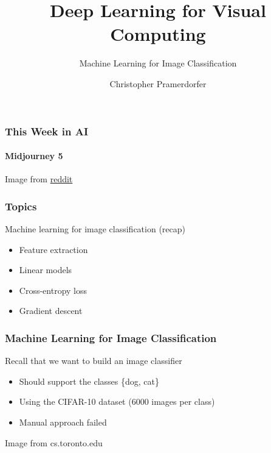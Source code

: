 \documentclass[xetex,professionalfont]{beamer}
\title{Deep Learning for Visual Computing}
\subtitle{Machine Learning for Image Classification}
\author{Christopher Pramerdorfer}
\institute{Computer Vision Lab, TU Wien}
\begin{document}
\begin{frame}
\maketitle
\end{frame}


\begin{frame}
\frametitle{This Week in AI}
\framesubtitle{Midjourney 5}

\begin{center}
  {\centering Image from \href{https://www.reddit.com/r/midjourney}{reddit}}
\end{center}
  
\end{frame}


\begin{frame}
\frametitle{Topics}

Machine learning for image classification (recap)
\begin{itemize}
    \item Feature extraction
    \item Linear models
    \item Cross-entropy loss
    \item Gradient descent
\end{itemize}

\end{frame}


\begin{frame}
\frametitle{Machine Learning for Image Classification}

Recall that we want to build an image classifier
\begin{itemize}
    \item Should support the classes \{dog, cat\}
    \item Using the CIFAR-10 dataset (6000 images per class)
    \item Manual approach failed
\end{itemize}

\bigskip

\begin{center}
    {\centering Image from cs.toronto.edu}
\end{center}

\end{frame}
\end{document}
